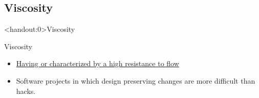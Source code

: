 \documentclass[xcolor=svgnames]{beamer}
\begin{document}

\subsection{Viscosity}


{%
%
\begin{frame}<handout:0>{Viscosity}
\end{frame}
}

{%
%
\begin{frame}{Viscosity}

    \begin{itemize}
        \item \href{https://www.merriam-webster.com/dictionary/viscous}
            {Having or characterized by a high resistance to flow}
        \item<2-> Software projects in which design preserving changes are more
            difficult than hacks.
    \end{itemize}
\end{frame}
}

\end{document}
